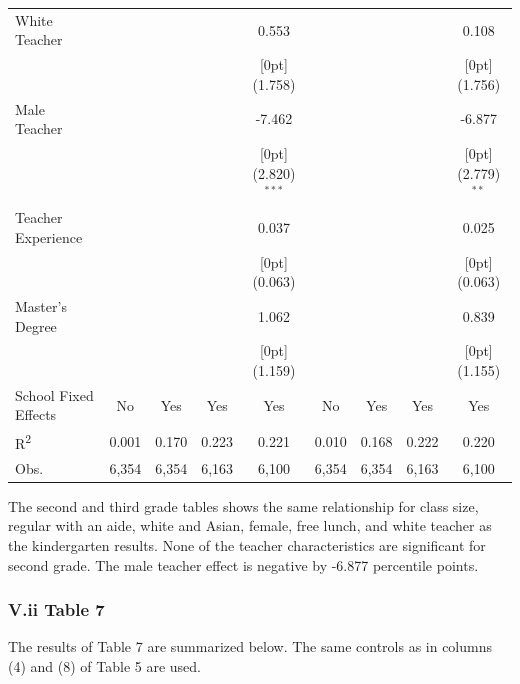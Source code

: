 \documentclass[a4paper,11pt]{article}
\begin{document}
\begin{table}[H]
\begin{tabular*}{\textwidth}{@{\extracolsep{\fill}}lcccccccc}
	White Teacher &	&	&	&	0.553 &	&	&	&	0.108\\
	&	&	&	&	\raisebox{.7ex}[0pt]{\scriptsize (1.758)} &	&	&	&	\raisebox{.7ex}[0pt]{\scriptsize (1.756)}\\
	Male Teacher &	&	&	&	-7.462  &	&	&	&	-6.877\\
	&	&	&	&	\raisebox{.7ex}[0pt]{\scriptsize (2.820)$^{***}$} 	&	&	&	&	\raisebox{.7ex}[0pt]{\scriptsize (2.779)$^{**}$} \\
	Teacher Experience &	&	&	&	0.037 &	&	&	&	0.025 \\
	&	&	&	&	\raisebox{.7ex}[0pt]{\scriptsize (0.063)} &	&	&	&	\raisebox{.7ex}[0pt]{\scriptsize (0.063)}\\
	Master's Degree &	&	&	&	1.062 &	&	&	&	0.839\\
	&	&	&	&	\raisebox{.7ex}[0pt]{\scriptsize (1.159)} &	&	&	&	\raisebox{.7ex}[0pt]{\scriptsize (1.155)}\\
	School Fixed Effects &	No  & Yes &	Yes & Yes &	No & Yes &	Yes & Yes \\
	R\textsuperscript{2} & 0.001 & 0.170 & 0.223 & 0.221 & 0.010 & 0.168 & 0.222 & 0.220  \\
	Obs. &	6,354 &	6,354 &	6,163 &	6,100 &	6,354 &	6,354 &	6,163 &	6,100 \\
	\hline\hline				
\end{tabular*}
\end{table}
The second and third grade tables shows the same relationship for class size, regular with an aide, white and Asian, female, free lunch, and white teacher as the kindergarten results. None of the teacher characteristics are significant for second grade. The male teacher effect is negative by -6.877 percentile points.  \par


\subsubsection*{V.ii Table 7}
The results of Table 7 are summarized below. The same controls as in columns (4) and (8) of Table 5 are used. \par
\end{document}
